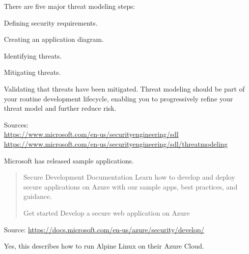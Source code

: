 \documentclass[Screen16to9,17pt]{foils}
\begin{document}
There are five major threat modeling steps:
\begin{list2}
\item Defining security requirements.
\item Creating an application diagram.
\item Identifying threats.
\item Mitigating threats.
\item Validating that threats have been mitigated.
Threat modeling should be part of your routine development lifecycle, enabling you to progressively refine your threat model and further reduce risk.
\end{list2}

Sources:\\
\url{https://www.microsoft.com/en-us/securityengineering/sdl}\\
\url{https://www.microsoft.com/en-us/securityengineering/sdl/threatmodeling}



Microsoft has released sample applications.

\begin{quote}
Secure Development Documentation
Learn how to develop and deploy secure applications on Azure with our sample apps, best practices, and guidance.

Get started
Develop a secure web application on Azure
\end{quote}

Source:
\url{https://docs.microsoft.com/en-us/azure/security/develop/}

Yes, this describes how to run Alpine Linux on their Azure Cloud.



\end{document}
